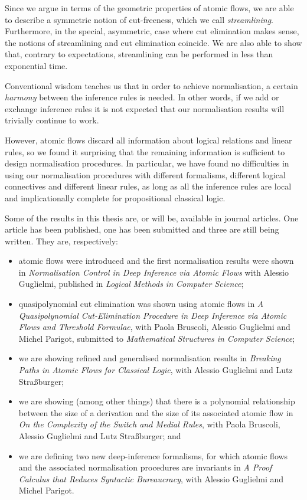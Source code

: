 Since we argue in terms of the geometric properties of atomic flows, we are able to describe a symmetric notion of cut-freeness, which we call \emph{streamlining}. Furthermore, in the special, asymmetric, case where cut elimination makes sense, the notions of streamlining and cut elimination coincide. We are also able to show that, contrary to expectations, streamlining can be performed in less than exponential time.

Conventional wisdom teaches us that in order to achieve normalisation, a certain \emph{harmony} between the inference rules is needed. In other words, if we add or exchange inference rules it is not expected that our normalisation results will trivially continue to work.

However, atomic flows discard all information about logical relations and linear rules, so we found it surprising that the remaining information is sufficient to design normalisation procedures. In particular, we have found no difficulties in using our normalisation procedures with different formalisms, different logical connectives and different linear rules, as long as all the inference rules are local and implicationally complete for propositional classical logic.

Some of the results in this thesis are, or will be, available in journal articles. One article has been published, one has been submitted and three are still being written. They are, respectively:
\begin{itemize}
 \item atomic flows were introduced and the first normalisation results were shown in \emph{Normalisation Control in Deep Inference via Atomic Flows} with Alessio Guglielmi, published in \emph{Logical Methods in Computer Science};
 \item quasipolynomial cut elimination was shown using atomic flows in \emph{A Quasipolynomial Cut-Elimination Procedure in Deep Inference via Atomic Flows and Threshold Formulae}, with Paola Bruscoli, Alessio Guglielmi and Michel Parigot, submitted to \emph{Mathematical Structures in Computer Science};
 \item we are showing refined and generalised normalisation results in \emph{Breaking Paths in Atomic Flows for Classical Logic}, with Alessio Guglielmi and Lutz Stra{\ss}burger;
 \item we are showing (among other things) that there is a polynomial relationship between the size of a derivation and the size of its associated atomic flow in \emph{On the Complexity of the Switch and Medial Rules}, with Paola Bruscoli, Alessio Guglielmi and Lutz Stra\ss{}burger; and
 \item we are defining two new deep-inference formalisms, for which atomic flows and the associated normalisation procedures are invariants in \emph{A Proof Calculus that Reduces Syntactic Bureaucracy}, with Alessio Guglielmi and Michel Parigot.
\end{itemize}

